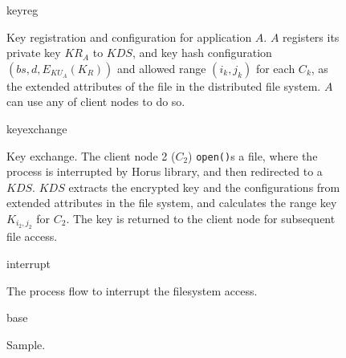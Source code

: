 \documentclass{article}
\def\gpicbox#1{%
\vbox{\unvbox\csname #1\endcsname\kern 0pt}}
\newcommand{\gpicfig}[2]{%

\begin{figure}
\begin{center}
\leavevmode
\gpicbox{#1}
\caption{#2}
\label{fig:#1}
\end{center}
\end{figure}
}
\begin{document}
\gpicfig{keyreg}{Key registration and configuration for application $A$.
$A$ registers its private key $KR_A$ to $KDS$, and key hash configuration
$(bs,d,E_{KU_A}(K_R))$ and allowed range $(i_k,j_k)$ for each $C_k$,
as the extended attributes of the file in the distributed file system.
$A$ can use any of client nodes to do so.}

\gpicfig{keyexchange}{Key exchange. The client node 2 ($C_2$) \texttt{open()}s
a file, where the process is interrupted by Horus library, and then
redirected to a $KDS$.
$KDS$ extracts the encrypted key and the configurations from extended
attributes in the file system, and calculates the range key $K_{i_2,j_2}$
for $C_2$. The key is returned to the client node for subsequent
file access.}

\gpicfig{interrupt}{The process flow to interrupt the filesystem access.}

\gpicfig{base}{Sample.}
\end{document}
